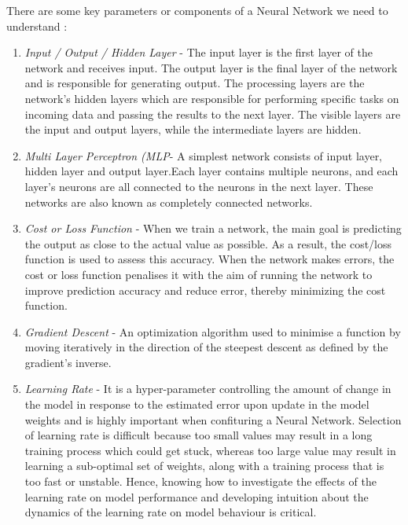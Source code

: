There are some key parameters or components of a Neural Network we need to understand \cite{backstrom_introduction_2022}:
\begin{enumerate}
    \item \textit{Input / Output / Hidden Layer} - The input layer is the first layer of the network and receives input. The output layer is the final layer of the network and is responsible for generating output. The processing layers are the network's hidden layers which are responsible for performing specific tasks on incoming data and passing the results to the next layer. The visible layers are the input and output layers, while the intermediate layers are hidden.
    \item \textit{Multi Layer Perceptron (MLP}- A simplest network consists of input layer, hidden layer and output layer.Each layer contains multiple neurons, and each layer's neurons are all connected to the neurons in the next layer. These networks are also known as completely connected networks.
    \item \textit{Cost or Loss Function} - When we train a network, the main goal is predicting the output as close to the actual value as possible. As a result, the cost/loss function is used to assess this accuracy. When the network makes errors, the cost or loss function penalises it with the aim of running the network to improve prediction accuracy and reduce error, thereby minimizing the cost function.
    \item \textit{Gradient Descent} - An optimization algorithm used to minimise a function by moving iteratively in the direction of the steepest descent as defined by the gradient's inverse.
    \item \textit{Learning Rate} - It is a hyper-parameter controlling the amount of change in the model in response to the estimated error upon update in the model weights and is highly important when confituring a Neural Network. Selection of learning rate is difficult because too small values may result in a long training process which could get stuck, whereas too large value may result in learning a sub-optimal set of weights, along with a training process that is too fast or unstable. Hence, knowing how to investigate the effects of the learning rate on model performance and developing intuition about the dynamics of the learning rate on model behaviour is critical.

\end{enumerate}
